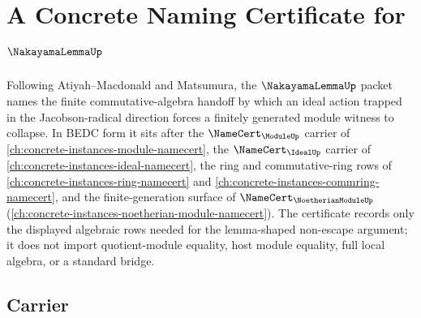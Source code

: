 \chapter{A Concrete Naming Certificate for $\NakayamaLemmaUp$}
\label{ch:concrete-instances-nakayama-lemma-namecert}

Following Atiyah--Macdonald and Matsumura, the $\NakayamaLemmaUp$ packet names
the finite commutative-algebra handoff by which an ideal action trapped in the
Jacobson-radical direction forces a finitely generated module witness to
collapse. In BEDC form it sits after the $\NameCert_{\ModuleUp}$ carrier of
\autoref{ch:concrete-instances-module-namecert}, the $\NameCert_{\IdealUp}$
carrier of \autoref{ch:concrete-instances-ideal-namecert}, the ring and
commutative-ring rows of \autoref{ch:concrete-instances-ring-namecert} and
\autoref{ch:concrete-instances-commring-namecert}, and the finite-generation
surface of $\NameCert_{\NoetherianModuleUp}$
(\autoref{ch:concrete-instances-noetherian-module-namecert}). The certificate
records only the displayed algebraic rows needed for the lemma-shaped
non-escape argument; it does not import quotient-module equality, host module
equality, full local algebra, or a standard bridge.

\section{Carrier}
\label{sec:nakayama-lemma-carrier}

